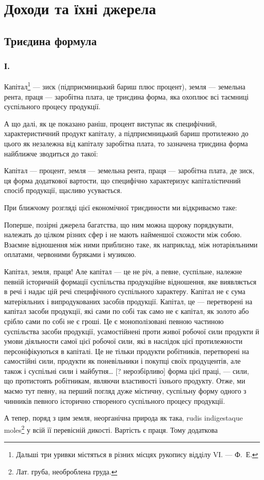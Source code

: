 
\chapter{Доходи та їхні джерела}

\section{Триєдина формула}

\subsection*{І.}

Капітал\footnote{Дальші три уривки містяться в різних місцях рукопису відділу VІ. — Ф.~Е.}
— зиск (підприємницький бариш плюс процент), земля — земельна
рента, праця — заробітна плата, це триєдина форма, яка охоплює всі таємниці
суспільного процесу продукції.

А що далі, як це показано раніш, процент виступає як специфічний,
характеристичний продукт капіталу, а підприємницький бариш протилежно
до цього як незалежна від капіталу заробітна плата, то зазначена триєдина
форма найближче зводиться до такої:

Капітал — процент, земля — земельна рента, праця — заробітна плата, де зиск,
ця форма додаткової вартости, що специфічно характеризує капіталістичний спосіб
продукції, щасливо усувається.

При ближчому розгляді цієї економічної триєдиности ми відкриваємо таке:

Поперше, позірні джерела багатства, що ним можна щороку порядкувати,
належать до цілком різних сфер і не мають найменшої схожости між собою.
Взаємне відношення між ними приблизно таке, як наприклад, між нотаріяльними
оплатами, червоними буряками і музикою.

Капітал, земля, праця! Але капітал — це не річ, а певне, суспільне,
належне певній історичній формації суспільства продукційне відношення, яке
виявляється в речі і надає цій речі специфічного суспільного характеру. Капітал
не є сума матеріяльних і випродукованих засобів продукції. Капітал, це —
перетворені на капітал засоби продукції, які сами по собі так само не є капітал,
як золото або срібло сами по собі не є гроші. Це є монополізовані певною
частиною суспільства засоби продукції, усамостійнені проти живої робочої сили
продукти й умови діяльности самої цієї робочої сили, які в наслідок цієї протилежности
персоніфікуються в капіталі. Це не тільки продукти робітників,
перетворені на самостійні сили, продукти як поневільники і покупці своїх продуцентів,
але також і суспільні сили і майбутня\dots{} [? нерозбірливо] форма цієї
праці, — сили, що протистоять робітникам, являючи властивості їхнього продукту.
Отже, ми маємо тут певну, на перший погляд дуже містичну, суспільну форму
одного з чинників певного історично створеного суспільного процесу продукції.

А тепер, поряд з цим земля, неорганічна природа як така, rudis indigestaque
moles\footnote*{
Лат. груба, необроблена груда. 
} у всій її перевісній дикості. Вартість є праця. Тому додаткова
\parbreak{}  %
